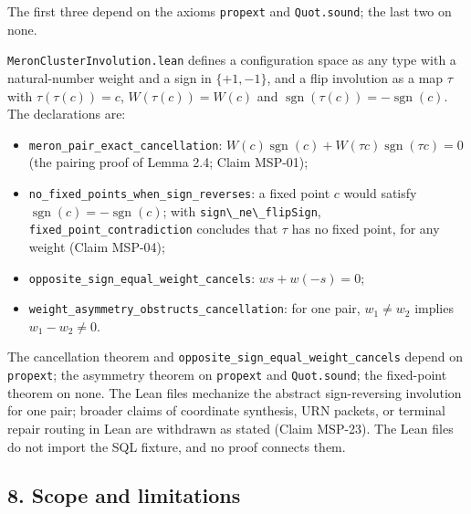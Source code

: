 \documentclass[
  11pt,
]{article}
\newcommand{\passthrough}[1]{#1}
\providecommand{\tightlist}{%
  \setlength{\itemsep}{0pt}\setlength{\parskip}{0pt}}
\begin{document}
The first three depend on the axioms \passthrough{\lstinline!propext!}
and \passthrough{\lstinline!Quot.sound!}; the last two on none.

\nolinkurl{MeronClusterInvolution.lean} defines a configuration space as
any type with a natural-number weight and a sign in \(\{+1, -1\}\), and
a flip involution as a map \(\tau\) with \(\tau(\tau(c)) = c\),
\(W(\tau(c)) = W(c)\) and
\(\operatorname{sgn}(\tau(c)) = -\operatorname{sgn}(c)\). The
declarations are:

\begin{itemize}
\tightlist
\item
  \nolinkurl{meron_pair_exact_cancellation}:
  \(W(c)\operatorname{sgn}(c) + W(\tau c)\operatorname{sgn}(\tau c) = 0\)
  (the pairing proof of Lemma 2.4; Claim MSP-01);
\item
  \nolinkurl{no_fixed_points_when_sign_reverses}: a fixed point \(c\)
  would satisfy \(\operatorname{sgn}(c) = -\operatorname{sgn}(c)\); with
  \passthrough{\lstinline!sign\_ne\_flipSign!},
  \nolinkurl{fixed_point_contradiction} concludes that \(\tau\) has no
  fixed point, for any weight (Claim MSP-04);
\item
  \nolinkurl{opposite_sign_equal_weight_cancels}: \(w s + w(-s) = 0\);
\item
  \nolinkurl{weight_asymmetry_obstructs_cancellation}: for one pair,
  \(w_1 \ne w_2\) implies \(w_1 - w_2 \ne 0\).
\end{itemize}

The cancellation theorem and
\nolinkurl{opposite_sign_equal_weight_cancels} depend on
\passthrough{\lstinline!propext!}; the asymmetry theorem on
\passthrough{\lstinline!propext!} and
\passthrough{\lstinline!Quot.sound!}; the fixed-point theorem on none.
The Lean files mechanize the abstract sign-reversing involution for one
pair; broader claims of coordinate synthesis, URN packets, or terminal
repair routing in Lean are withdrawn as stated (Claim MSP-23). The Lean
files do not import the SQL fixture, and no proof connects them.

\subsection{8. Scope and limitations}\label{scope-and-limitations}
\end{document}
